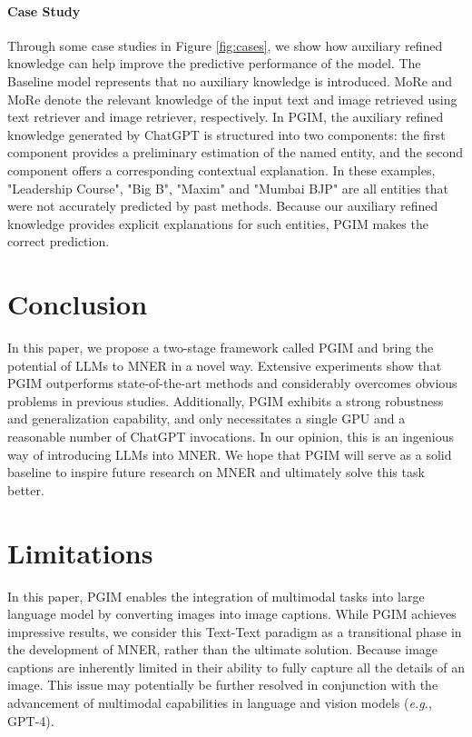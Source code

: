 \documentclass[11pt]{article}
\begin{document}
\paragraph{Case Study}
Through some case studies in Figure \ref{fig:cases}, we show how auxiliary refined knowledge can help improve the predictive performance of the model. The Baseline model represents that no auxiliary knowledge is introduced. MoRe and MoRe denote the relevant knowledge of the input text and image retrieved using text retriever and image retriever, respectively. 
In PGIM, the auxiliary refined knowledge generated by ChatGPT is structured into two components: the first component provides a preliminary estimation of the named entity, and the second component offers a corresponding contextual explanation. 
In these examples, "Leadership Course", "Big B", "Maxim" and "Mumbai BJP" are all entities that were not accurately predicted by past methods. Because our auxiliary refined knowledge provides explicit explanations for such entities, PGIM makes the correct prediction.


\section{Conclusion}
In this paper, we propose a two-stage framework called PGIM and bring the potential of LLMs to MNER in a novel way. 
Extensive experiments show that PGIM outperforms state-of-the-art methods and considerably overcomes obvious problems in previous studies. 
Additionally, PGIM exhibits a strong robustness and generalization capability, and only necessitates a single GPU and a reasonable number of ChatGPT invocations. 
In our opinion, this is an ingenious way of introducing LLMs into MNER. 
We hope that PGIM will serve as a solid baseline to inspire future research on MNER and ultimately solve this task better.

\section*{Limitations}
In this paper, PGIM enables the integration of multimodal tasks into large language model by converting images into image captions. While PGIM achieves impressive results, we consider this Text-Text paradigm as a transitional phase in the development of MNER, rather than the ultimate solution. Because image captions are inherently limited in their ability to fully capture all the details of an image. This issue may potentially be further resolved in conjunction with the advancement of multimodal capabilities in language and vision models (\emph{e.g.}, GPT-4).
\end{document}
